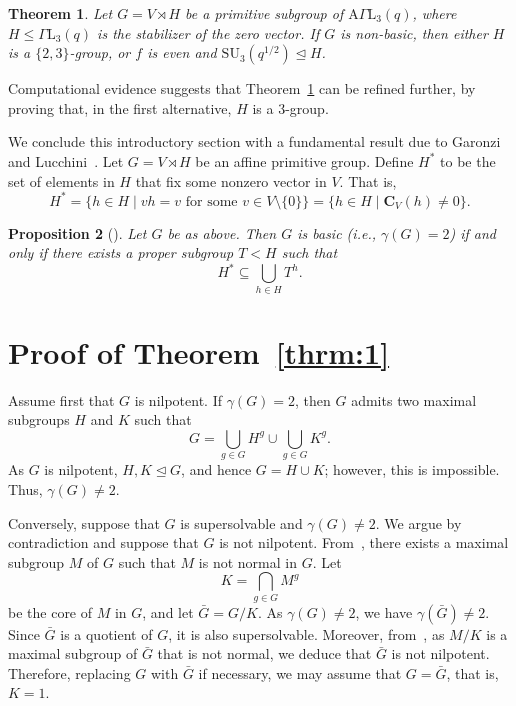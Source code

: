 \documentclass{amsart}
\newtheorem{theorem}{Theorem}[section]
\newtheorem{proposition}[theorem]{Proposition}
\begin{document}
\begin{theorem}\label{conj}
Let $G = V \rtimes H$ be a primitive subgroup of $\mathrm{A}\Gamma\mathrm{L}_3(q)$, where $H \le \Gamma\mathrm{L}_3(q)$ is the stabilizer of the zero vector. If $G$ is non-basic, then either $H$ is a $\{2,3\}$-group, or $f$ is even and $\mathrm{SU}_3(q^{1/2}) \unlhd H$.
\end{theorem}
Computational evidence suggests that Theorem~\ref{conj} can be refined further, by proving that, in the first alternative, $H$ is a $3$-group.

We conclude this introductory section with a fundamental result due to Garonzi and Lucchini~\cite{GL}. Let $G = V \rtimes H$ be an affine primitive group. Define $H^*$ to be the set of elements in $H$ that fix some nonzero vector in $V$. That is,
\[
H^* = \{ h \in H \mid v h = v \text{ for some } v \in V \setminus \{0\} \} = \{ h \in H \mid \mathbf{C}_V(h) \ne 0 \}.
\]

\begin{proposition}[{\cite[Corollary~14]{GL}}]\label{prop:gl}
Let $G$ be as above. Then $G$ is basic (i.e., $\gamma(G) = 2$) if and only if there exists a proper subgroup $T < H$ such that
\[
H^* \subseteq \bigcup_{h \in H} T^h.
\]
\end{proposition}

\section{Proof of Theorem~\ref{thrm:1}}\label{sec:easy}
Assume first that $G$ is nilpotent. If $\gamma(G) = 2$, then $G$ admits two maximal subgroups $H$ and $K$ such that
\[
G = \bigcup_{g \in G} H^g \cup \bigcup_{g \in G} K^g.
\]
As $G$ is nilpotent, $H, K \unlhd G$, and hence $G = H \cup K$; however, this is impossible. Thus, $\gamma(G) \ne 2$.

Conversely, suppose that $G$ is supersolvable and $\gamma(G) \ne 2$. We argue by contradiction and suppose that $G$ is not nilpotent. From~\cite[5.2.4]{robinson}, there exists a maximal subgroup $M$ of $G$ such that $M$ is not normal in $G$. Let 
\[
K = \bigcap_{g \in G} M^g
\]
be the core of $M$ in $G$, and let $\bar{G} = G/K$. As $\gamma(G) \ne 2$, we have $\gamma(\bar{G}) \ne 2$. Since $\bar{G}$ is a quotient of $G$, it is also supersolvable. Moreover, from~\cite[5.2.4]{robinson}, as $M/K$ is a maximal subgroup of $\bar{G}$ that is not normal, we deduce that $\bar{G}$ is not nilpotent. Therefore, replacing $G$ with $\bar{G}$ if necessary, we may assume that $G = \bar{G}$, that is, $K = 1$.
\end{document}
